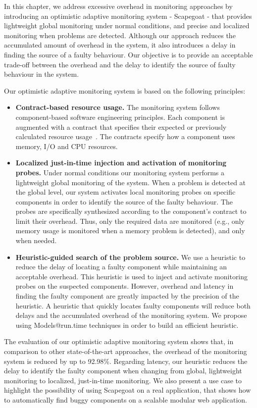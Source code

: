 In this chapter, we address excessive overhead in monitoring approaches by introducing an optimistic adaptive monitoring system - Scapegoat - that provides lightweight global monitoring under normal conditions, and precise and localized monitoring when problems are detected.
Although our approach reduces the accumulated amount of overhead in the system, it also introduces a delay in finding the source of a faulty behaviour.
Our objective is to provide an acceptable trade-off between the overhead and the delay to identify the source of faulty behaviour in the system.

Our optimistic adaptive monitoring system is based on the following principles:
\begin{itemize}
\leftskip -.2in %
 \item \textbf{Contract-based resource usage.}
The monitoring system follows component-based software engineering principles. 
Each component is augmented with a contract that specifies their expected or previously calculated resource usage~\cite{Beugnard774917}. 
The contracts specify how a component uses memory, I/O and CPU resources.
 \item \textbf{Localized just-in-time injection and activation of monitoring probes.} 
Under normal conditions our monitoring system performs a lightweight global monitoring of the system. 
When a problem is detected at the global level, our system activates local monitoring probes on specific components in order to identify the source of the faulty behaviour.
The probes are specifically synthesized according to the component's contract to limit their overhead.
Thus, only the required data are monitored (e.g., only memory usage is monitored when a memory problem is detected), and only when needed.
  \item \textbf{Heuristic-guided search of the problem source.} 
We use a heuristic to reduce the delay of locating a faulty component while maintaining an acceptable overhead.
This heuristic is used to inject and activate monitoring probes on the suspected components. 
However, overhead and latency in finding the faulty component are greatly impacted by the precision of the heuristic.
A heuristic that quickly locates faulty components will reduce both delays and the accumulated overhead of the monitoring system.
We propose using Models@run.time techniques in order to build an efficient heuristic.
\end{itemize}

The evaluation of our optimistic adaptive monitoring system shows that, in comparison to other state-of-the-art approaches, the overhead of the monitoring system is reduced by up to 92.98\%.
Regarding latency, our heuristic reduces the delay to identify the faulty component when changing from global, lightweight monitoring to localized, just-in-time monitoring.
We also present a use case to highlight the possibility of using Scapegoat on a real application, that shows how to automatically find buggy components on a scalable modular web application.

